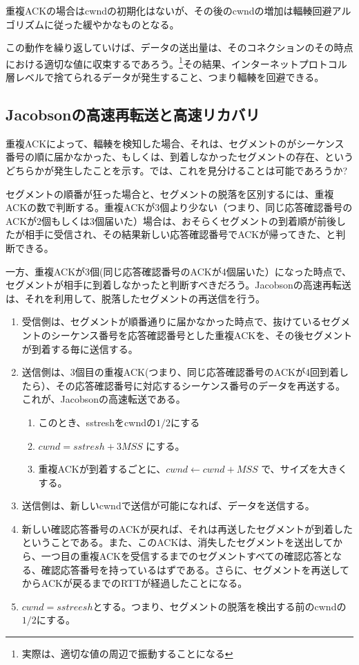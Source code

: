 重複ACKの場合はcwndの初期化はないが、その後のcwndの増加は輻輳回避アルゴリズムに従った緩やかなものとなる。

この動作を繰り返していけば、データの送出量は、そのコネクションのその時点における適切な値に収束するであろう。\footnote{実際は、適切な値の周辺で振動することになる}その結果、インターネットプロトコル層レベルで捨てられるデータが発生すること、つまり輻輳を回避できる。

\subsection{Jacobsonの高速再転送と高速リカバリ}

重複ACKによって、輻輳を検知した場合、それは、セグメントのがシーケンス番号の順に届かなかった、もしくは、到着しなかったセグメントの存在、というどちらかが発生したことを示す。では、これを見分けることは可能であろうか?

セグメントの順番が狂った場合と、セグメントの脱落を区別するには、重複ACKの数で判断する。重複ACKが3個より少ない（つまり、同じ応答確認番号の ACKが2個もしくは3個届いた）場合は、おそらくセグメントの到着順が前後したが相手に受信され、その結果新しい応答確認番号でACKが帰ってきた、と判断できる。

一方、重複ACKが3個(同じ応答確認番号のACKが4個届いた）になった時点で、セグメントが相手に到着しなかったと判断すべきだろう。Jacobsonの高速再転送は、それを利用して、脱落したセグメントの再送信を行う。

\begin{enumerate}
\item 受信側は、セグメントが順番通りに届かなかった時点で、抜けているセグメントのシーケンス番号を応答確認番号とした重複ACKを、その後セグメントが到着する毎に送信する。
\item 送信側は、3個目の重複ACK(つまり、同じ応答確認番号のACKが4回到着したら）、その応答確認番号に対応するシーケンス番号のデータを再送する。これが、Jacobsonの高速転送である。
			\begin{enumerate}
            \item このとき、sstreshをcwndの$1/2$にする
            \item $cwnd = sstresh + 3MSS$ にする。
            \item 重複ACKが到着するごとに、$cwnd ← cwnd + MSS$ で、サイズを大きくする。
            \end{enumerate}
\item 送信側は、新しいcwndで送信が可能になれば、データを送信する。
\item 新しい確認応答番号のACKが戻れば、それは再送したセグメントが到着したということである。また、このACKは、消失したセグメントを送出してから、一つ目の重複ACKを受信するまでのセグメントすべての確認応答となる、確認応答番号を持っているはずである。さらに、セグメントを再送してからACKが戻るまでのRTTが経過したことになる。
\item     $cwnd = sstreesh$とする。つまり、セグメントの脱落を検出する前のcwndの$1/2$にする。
\end{enumerate}

